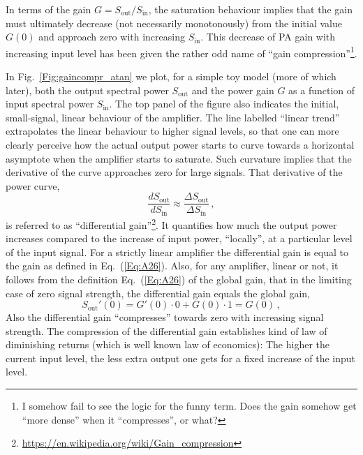 \documentclass[11pt,oneside,a4paper]{scrartcl}
\newcommand{\EQ}[1]{\begin{equation}\label{Eq:#1}}
\newcommand{\EE}{\end{equation}}
\newcommand{\Eq}[1]{Eq.~(\ref{Eq:#1})}
\newcommand{\Fig}[1]{Fig.~\ref{Fig:#1}}
\newcommand { \mr }[1] {\ensuremath {\mathrm{#1}}}
\begin{document}
In terms of the gain $G = S_\mr{out}/S_\mr{in}$, the saturation behaviour implies that the gain must ultimately decrease (not necessarily monotonously) from the initial value $G(0)$ and approach zero with increasing $S_\mr{in}$. This  decrease of PA gain with increasing input level has been given the rather odd name of ``gain compression''\footnote{I somehow fail to see the logic for the funny term. Does the gain somehow get ``more dense'' when it ``compresses'', or what?}.

In \Fig{gaincompr_atan} we plot, for a simple toy model (more of which later), both the output spectral power $S_\mr{out}$ and the power gain $G$ as a function of input spectral power $S_\mr{in}$.
The top panel of the figure also indicates the initial, small-signal, linear behaviour of the amplifier. The line labelled ``linear trend'' extrapolates the linear behaviour to higher signal levels, so that one can more clearly perceive how the actual output power starts to curve towards a horizontal asymptote when the amplifier starts to saturate. 
Such curvature implies that the derivative of the curve approaches zero for large signals. That derivative of the power curve,
\EQ{A30}
	\frac {dS_\mathrm{out}} {dS_\mathrm{in}} 
	\approx 
	\frac {\Delta S_\mathrm{out}} {\Delta S_\mathrm{in}} \,,
\EE
is referred to as ``differential gain''\footnote{
%
\url{https://en.wikipedia.org/wiki/Gain_compression}
%
}.
%
It quantifies how much the output power increases compared to the increase of input power, ``locally'', at a particular level of the input signal. For a strictly linear amplifier the differential gain is equal to the gain as defined in \Eq{A26}. Also, for any amplifier, linear or not, it follows from the definition \Eq{A26} of the global gain, that in the limiting case of zero signal strength, the differential gain equals the global gain,
\EQ{A40}
	S_\mr{out}'(0) = G'(0)\cdot 0 + G(0) \cdot 1 = G(0) \,,
\EE
Also the differential gain ``compresses'' towards zero with increasing signal strength. The compression of the differential gain establishes kind of law of diminishing returns (which is well known law of economics): The higher the current input level, the less extra output one gets for a fixed increase of the input level. 
\end{document}

